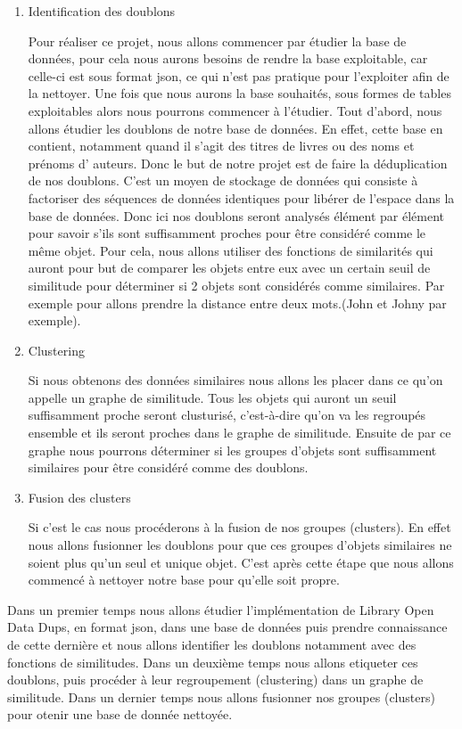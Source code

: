 \documentclass[12pt, openany]{article}
\begin{document}
\begin{enumerate}
\item Identification des doublons


Pour réaliser ce projet, nous allons commencer par étudier la base de données, pour cela nous aurons besoins de rendre la base exploitable, car celle-ci est sous format json, ce qui n’est pas pratique pour l’exploiter afin de la nettoyer. Une fois que nous aurons la base souhaités, sous formes de tables exploitables alors nous pourrons commencer à l’étudier.
Tout d’abord, nous allons  étudier les doublons de notre base de données. En effet, cette base en contient, notamment quand il s'agit des titres de livres ou des noms et prénoms d' auteurs. Donc le but de notre projet est de faire la déduplication de nos doublons. C’est un moyen de stockage de données qui consiste à  factoriser des séquences de données identiques pour libérer de l’espace dans la base de données. Donc ici nos doublons seront analysés élément par élément pour savoir s’ils sont suffisamment proches pour être considéré comme le même objet.
Pour cela, nous allons utiliser des fonctions de similarités qui auront pour but de comparer les objets entre eux avec un certain seuil de similitude pour déterminer si 2 objets sont considérés comme similaires. Par exemple pour allons prendre la distance entre deux mots.(John et Johny par exemple).



\item Clustering



Si nous obtenons des données similaires nous allons les placer dans ce qu’on appelle un graphe de similitude. Tous les objets qui auront un seuil suffisamment proche seront clusturisé, c’est-à-dire qu’on va les regroupés ensemble et ils seront proches dans le graphe de similitude. Ensuite de par ce  graphe nous pourrons déterminer si les groupes d’objets sont suffisamment similaires pour être considéré comme des doublons.

\bigskip


\item Fusion des clusters

Si c’est le cas nous procéderons à la fusion de nos groupes (clusters). En effet nous allons fusionner les doublons pour que ces groupes d’objets similaires ne soient plus qu’un seul et unique objet. C'est après cette étape que nous allons commencé à nettoyer notre base pour qu'elle soit propre. 


\end{enumerate}


Dans un premier temps nous allons étudier l'implémentation de Library Open Data Dups, en format json, dans une base de données puis prendre connaissance de cette dernière et nous allons identifier les doublons notamment avec des fonctions de similitudes.
Dans un deuxième temps nous allons etiqueter ces doublons, puis procéder à leur regroupement (clustering) dans un graphe de similitude.
Dans un dernier temps nous allons fusionner nos groupes (clusters) pour otenir une base de donnée nettoyée.
\end{document}
